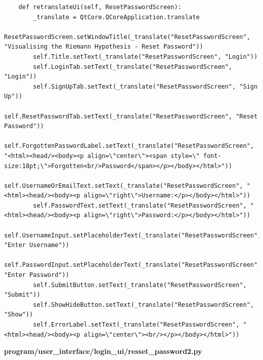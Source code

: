 \documentclass{article}
\begin{document}
\begin{lstlisting}
    def retranslateUi(self, ResetPasswordScreen):
        _translate = QtCore.QCoreApplication.translate
        ResetPasswordScreen.setWindowTitle(_translate("ResetPasswordScreen", "Visualising the Riemann Hypothesis - Reset Password"))
        self.Title.setText(_translate("ResetPasswordScreen", "Login"))
        self.LoginTab.setText(_translate("ResetPasswordScreen", "Login"))
        self.SignUpTab.setText(_translate("ResetPasswordScreen", "Sign Up"))
        self.ResetPasswordTab.setText(_translate("ResetPasswordScreen", "Reset Password"))
        self.ForgottenPasswordLabel.setText(_translate("ResetPasswordScreen", "<html><head/><body><p align=\"center\"><span style=\" font-size:18pt;\">Forgotten<br/>Password</span></p></body></html>"))
        self.UsernameOrEmailText.setText(_translate("ResetPasswordScreen", "<html><head/><body><p align=\"right\">Username:</p></body></html>"))
        self.PasswordText.setText(_translate("ResetPasswordScreen", "<html><head/><body><p align=\"right\">Password:</p></body></html>"))
        self.UsernameInput.setPlaceholderText(_translate("ResetPasswordScreen", "Enter Username"))
        self.PasswordInput.setPlaceholderText(_translate("ResetPasswordScreen", "Enter Password"))
        self.SubmitButton.setText(_translate("ResetPasswordScreen", "Submit"))
        self.ShowHideButton.setText(_translate("ResetPasswordScreen", "Show"))
        self.ErrorLabel.setText(_translate("ResetPasswordScreen", "<html><head/><body><p align=\"center\"><br/></p></body></html>"))
\end{lstlisting}


\textbf{program/user\_interface/login\_ui/resset\_password2.py}
\end{document}
